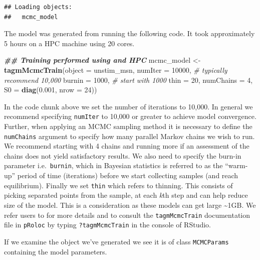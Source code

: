 \documentclass[9pt,a4paper,]{extarticle}
\newenvironment{Shaded}{\begin{snugshade}}{\end{snugshade}}
\newcommand{\AttributeTok}[1]{\textcolor[rgb]{0.13,0.29,0.53}{#1}}
\newcommand{\CommentTok}[1]{\textcolor[rgb]{0.56,0.35,0.01}{\textit{#1}}}
\newcommand{\DecValTok}[1]{\textcolor[rgb]{0.00,0.00,0.81}{#1}}
\newcommand{\DocumentationTok}[1]{\textcolor[rgb]{0.56,0.35,0.01}{\textbf{\textit{#1}}}}
\newcommand{\FloatTok}[1]{\textcolor[rgb]{0.00,0.00,0.81}{#1}}
\newcommand{\FunctionTok}[1]{\textcolor[rgb]{0.13,0.29,0.53}{\textbf{#1}}}
\newcommand{\NormalTok}[1]{#1}
\newcommand{\OtherTok}[1]{\textcolor[rgb]{0.56,0.35,0.01}{#1}}
\begin{document}
\begin{verbatim}
## Loading objects:
##   mcmc_model
\end{verbatim}

The model was generated from running the following code. It took approximately 5
hours on a HPC machine using 20 cores.

\begin{Shaded}
\begin{Highlighting}[]
\DocumentationTok{\#\# Training performed using and HPC}
\NormalTok{mcmc\_model }\OtherTok{\textless{}{-}} \FunctionTok{tagmMcmcTrain}\NormalTok{(}\AttributeTok{object =}\NormalTok{ unstim\_msn,}
                            \AttributeTok{numIter =} \DecValTok{10000}\NormalTok{, }\CommentTok{\# typically recommend 10,000}
                            \AttributeTok{burnin =} \DecValTok{1000}\NormalTok{,   }\CommentTok{\# start with 1000}
                            \AttributeTok{thin =} \DecValTok{20}\NormalTok{,}
                            \AttributeTok{numChains =} \DecValTok{4}\NormalTok{,}
                            \AttributeTok{S0 =} \FunctionTok{diag}\NormalTok{(}\FloatTok{0.001}\NormalTok{, }\AttributeTok{nrow =} \DecValTok{24}\NormalTok{))}
\end{Highlighting}
\end{Shaded}

In the code chunk above we set the number of iterations to 10,000. In general we
recommend specifying \texttt{numIter} to 10,000 or greater to achieve model convergence.
Further, when applying an MCMC sampling method it is necessary to define the
\texttt{numChains} argument to specify how many parallel Markov chains we wish to run.
We recommend starting with 4 chains and running more if an assessment of the
chains does not yield satisfactory results. We also need to specify the burn-in
parameter i.e.~\texttt{burnin}, which in Bayesian statistics is referred to as the
``warm-up'' period of time (iterations) before we start collecting samples (and
reach equilibrium). Finally we set \texttt{thin} which refers to thinning. This
consists of picking separated points from the sample, at each \emph{k}th step and can
help reduce size of the model. This is a consideration as these models can get
large \textasciitilde1GB. We refer users to \citet{Crook2019} for more details and to consult the
\texttt{tagmMcmcTrain} documentation file in \texttt{pRoloc} by typing \texttt{?tagmMcmcTrain} in the
console of RStudio.

If we examine the object we've generated we see it is of class \texttt{MCMCParams}
containing the model parameters.
\end{document}
